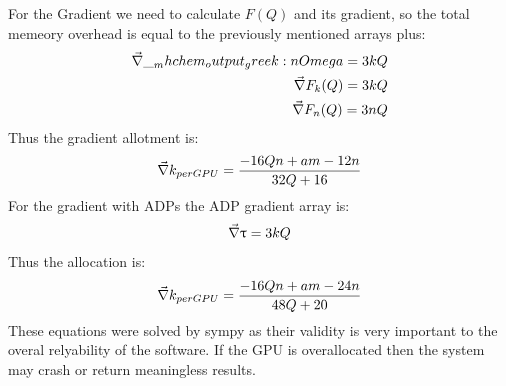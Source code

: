 For the Gradient we need to calculate $F(Q)$ and its gradient, so the total memeory overhead is equal to the previously mentioned arrays plus:
\begin{eqnarray}
    \vec{\nabla} \__mhchem_output_greek:n { Omega } = 3kQ \\
    \vec{\nabla} F_{k}(Q) = 3kQ \\
    \vec{\nabla} F_{n}(Q) = 3nQ
\end{eqnarray}
Thus the gradient allotment is:
\begin{equation}
    \vec{\nabla} k_{per GPU} = \frac{- 16 Q n + am - 12 n}{32 Q + 16}
\end{equation}
For the gradient with ADPs the ADP gradient array is:
\begin{equation}
    \vec{\nabla} \uptau = 3kQ
\end{equation}
Thus the allocation is:
\begin{equation}
    \vec{\nabla} k_{per GPU} = \frac{ - 16 Q n + am - 24 n}{48 Q + 20}
\end{equation}
These equations were solved by sympy as their validity is very important to the overal relyability of the software.
If the GPU is overallocated then the system may crash or return meaningless results.

